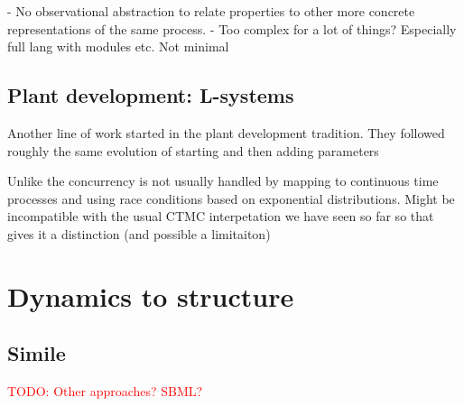 \documentclass[phd]{infthesis}
\newcommand{\todo}[1]{\textcolor{red}{TODO: #1}}
\begin{document}
- No observational abstraction to relate properties to other more concrete
representations of the same process.
- Too complex for a lot of things? Especially full lang with modules etc. Not
minimal



\subsection{Plant development: L-systems}
Another line of work started in the plant development tradition.
They followed roughly the same evolution of starting and then adding parameters

Unlike the concurrency is not usually handled by mapping to continuous time
processes and using race conditions based on exponential distributions. Might be
incompatible with the usual CTMC interpetation we have seen so far so that gives
it a distinction (and possible a limitaiton)



\section{Dynamics to structure}
\subsection{Simile}


\todo{Other approaches? SBML? }




\singlespace


\printbibliography[heading=bibintoc]

\end{document}
